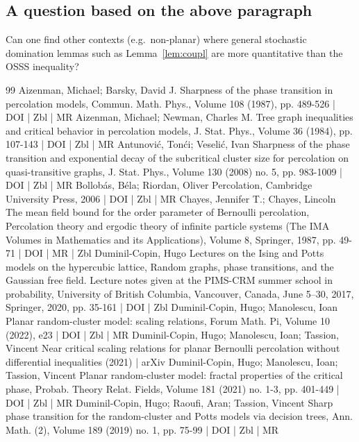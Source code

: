 \documentclass[10pt]{amsart}
\theoremstyle{definition}\newtheorem{defi}[theo]{Definition}\newtheorem{rema}[theo]{Remark}\newtheorem{exam}[theo]{Example}\newtheorem{exem}[theo]{Example}\newtheorem{nota}[theo]{Notation}
\begin{document}
\subsection{A question based on the above paragraph}

Can one find other contexts (e.g.\ non-planar) where general stochastic domination lemmas such as Lemma~\ref{lem:coupl} are more quantitative than the OSSS inequality?



\begin{thebibliography}{99}
 Aizenman, Michael; Barsky, David J. Sharpness of the phase transition in percolation models, Commun. Math. Phys., Volume 108 (1987), pp. 489-526 | DOI | Zbl | MR
 Aizenman, Michael; Newman, Charles M. Tree graph inequalities and critical behavior in percolation models, J. Stat. Phys., Volume 36 (1984), pp. 107-143 | DOI | Zbl | MR
 Antunović, Tonći; Veselić, Ivan Sharpness of the phase transition and exponential decay of the subcritical cluster size for percolation on quasi-transitive graphs, J. Stat. Phys., Volume 130 (2008) no. 5, pp. 983-1009 | DOI | Zbl | MR
 Bollobás, Béla; Riordan, Oliver Percolation, Cambridge University Press, 2006 | DOI | Zbl | MR
 Chayes, Jennifer T.; Chayes, Lincoln The mean field bound for the order parameter of Bernoulli percolation, Percolation theory and ergodic theory of infinite particle systems (The IMA Volumes in Mathematics and its Applications), Volume 8, Springer, 1987, pp. 49-71 | DOI | MR | Zbl
 Duminil-Copin, Hugo Lectures on the Ising and Potts models on the hypercubic lattice, Random graphs, phase transitions, and the Gaussian free field. Lecture notes given at the PIMS-CRM summer school in probability, University of British Columbia, Vancouver, Canada, June 5–30, 2017, Springer, 2020, pp. 35-161 | DOI | Zbl
 Duminil-Copin, Hugo; Manolescu, Ioan Planar random-cluster model: scaling relations, Forum Math. Pi, Volume 10 (2022), e23 | DOI | Zbl | MR
 Duminil-Copin, Hugo; Manolescu, Ioan; Tassion, Vincent Near critical scaling relations for planar Bernoulli percolation without differential inequalities (2021) | arXiv
 Duminil-Copin, Hugo; Manolescu, Ioan; Tassion, Vincent Planar random-cluster model: fractal properties of the critical phase, Probab. Theory Relat. Fields, Volume 181 (2021) no. 1-3, pp. 401-449 | DOI | Zbl | MR
 Duminil-Copin, Hugo; Raoufi, Aran; Tassion, Vincent Sharp phase transition for the random-cluster and Potts models via decision trees, Ann. Math. (2), Volume 189 (2019) no. 1, pp. 75-99 | DOI | Zbl | MR

\end{thebibliography}
\end{document}
